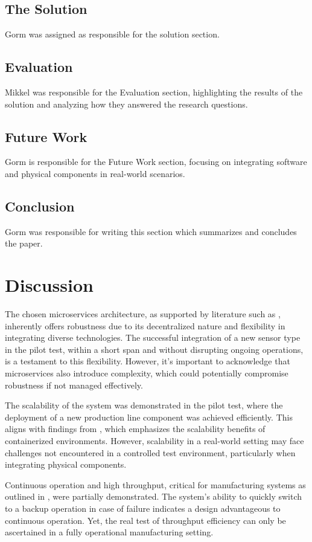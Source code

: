 \documentclass[conference]{IEEEtran}
\begin{document}
\subsection{The Solution}
Gorm was assigned as responsible for the solution section.

\subsection{Evaluation}
Mikkel was responsible for the Evaluation section, highlighting the results of the solution and analyzing how they answered the research questions.

\subsection{Future Work}
Gorm is responsible for the Future Work section, focusing on integrating software and physical components in real-world scenarios.

\subsection{Conclusion}
Gorm was responsible for writing this section which summarizes and concludes the paper.

\section{Discussion}
The chosen microservices architecture, as supported by literature such as \cite{AdoptingMicroservicesDevOps}, inherently offers robustness due to its decentralized nature and flexibility in integrating diverse technologies. The successful integration of a new sensor type in the pilot test, within a short span and without disrupting ongoing operations, is a testament to this flexibility. However, it's important to acknowledge that microservices also introduce complexity, which could potentially compromise robustness if not managed effectively.

The scalability of the system was demonstrated in the pilot test, where the deployment of a new production line component was achieved efficiently. This aligns with findings from \cite{UseOfLightweightVirtualization}, which emphasizes the scalability benefits of containerized environments. However, scalability in a real-world setting may face challenges not encountered in a controlled test environment, particularly when integrating physical components.

Continuous operation and high throughput, critical for manufacturing systems as outlined in \cite{IoT-fog-based-healthcare}, were partially demonstrated. The system's ability to quickly switch to a backup operation in case of failure indicates a design advantageous to continuous operation. Yet, the real test of throughput efficiency can only be ascertained in a fully operational manufacturing setting.
\end{document}
